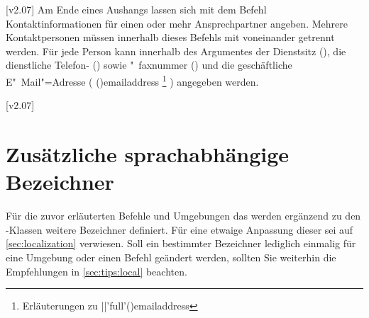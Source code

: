 \begin{DeclareEntity}{}
\begin{Declaration}
\begin{Declaration*}
\begin{Declaration*}
\begin{Declaration}
\begin{Declaration}
\begin{Declaration}
[v2.07]
Am Ende eines Aushangs lassen sich mit dem Befehl  
Kontaktinformationen für einen oder mehr Ansprechpartner angeben. Mehrere 
Kontaktpersonen müssen innerhalb dieses Befehls mit  voneinander 
getrennt werden. Für jede Person kann innerhalb des Argumentes der Dienstsitz 
(), die dienstliche Telefon- () sowie "~faxnummer
() und die geschäftliche E"~Mail"=Adresse (%
  \Macro(){emailaddress}%
  \footnote{Erläuterungen zu \Macro||'full'(){emailaddress}}%
) angegeben werden.
\end{Declaration}
\end{Declaration}
\end{Declaration}
\end{Declaration*}
\end{Declaration*}
\end{Declaration}
%

[v2.07]



\section{%
  Zusätzliche sprachabhängige Bezeichner%
}

Für die zuvor erläuterten Befehle und Umgebungen das werden ergänzend zu den 
\TUDScript-Klassen weitere Bezeichner definiert. Für eine etwaige Anpassung 
dieser sei auf \autoref{sec:localization} verwiesen. Soll ein bestimmter 
Bezeichner lediglich einmalig für eine Umgebung oder einen Befehl geändert 
werden, sollten Sie weiterhin die Empfehlungen in \autoref{sec:tips:local} 
beachten.


\end{DeclareEntity}
